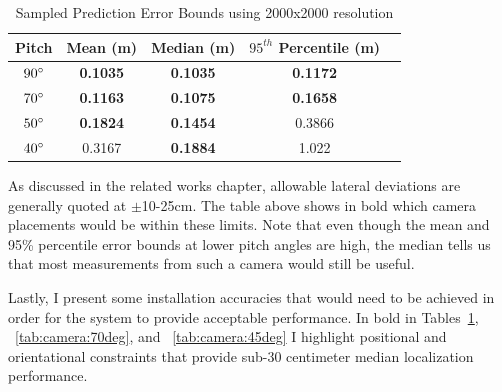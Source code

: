 \documentclass[a4paper,12pt,twoside,openright]{report}
\begin{document}
\begin{table}[htb]
    \centering
    \caption{Sampled Prediction Error Bounds using 2000x2000 resolution}
    \label{tab:camera:best error bounds}
    \begin{tabular}{@{}ccccc@{}}
        \toprule 
        \textbf{Pitch}       & \textbf{Mean (m)}   & \textbf{Median (m)} & \textbf{$95^{th}$ Percentile (m)} &  \\ \midrule 
        $90\degree$ & \textbf{0.1035} & \textbf{0.1035} & \textbf{0.1172}           &  \\ 
        $70\degree$ & \textbf{0.1163} & \textbf{0.1075} & \textbf{0.1658}           &  \\
        $50\degree$ & \textbf{0.1824} & \textbf{0.1454} & 0.3866           &  \\
        $40\degree$ & 0.3167 & \textbf{0.1884} & 1.022            &  \\ \midrule
    \end{tabular}
\end{table}


As discussed in the related works chapter, allowable lateral deviations are generally
quoted at $\pm$10-25cm. The table above shows in bold which camera placements would be 
within these limits. Note that even though the mean and 95\% percentile error bounds
at lower pitch angles are high, the median tells us that most measurements
from such a camera would still be useful.

Lastly, I present some installation accuracies that would need to be achieved
in order for the system to provide acceptable performance. In bold in 
Tables~\ref{tab:camera:best error bounds}, ~\ref{tab:camera:70deg}, and
~\ref{tab:camera:45deg} I highlight positional and orientational 
constraints that provide sub-30 centimeter median localization performance.
\end{document}
